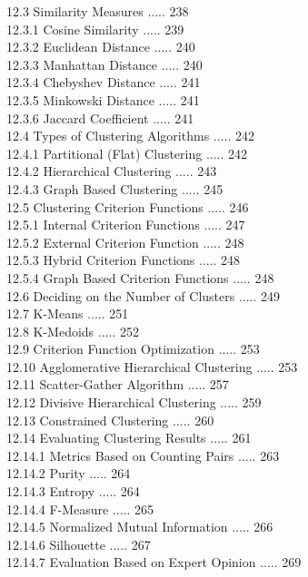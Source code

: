 \documentclass[10pt]{book}
\begin{document}
\begin{enumerate}
12.3 Similarity Measures ..... 238\\
12.3.1 Cosine Similarity ..... 239\\
12.3.2 Euclidean Distance ..... 240\\
12.3.3 Manhattan Distance ..... 240\\
12.3.4 Chebyshev Distance ..... 241\\
12.3.5 Minkowski Distance ..... 241\\
12.3.6 Jaccard Coefficient ..... 241\\
12.4 Types of Clustering Algorithms ..... 242\\
12.4.1 Partitional (Flat) Clustering ..... 242\\
12.4.2 Hierarchical Clustering ..... 243\\
12.4.3 Graph Based Clustering ..... 245\\
12.5 Clustering Criterion Functions ..... 246\\
12.5.1 Internal Criterion Functions ..... 247\\
12.5.2 External Criterion Function ..... 248\\
12.5.3 Hybrid Criterion Functions ..... 248\\
12.5.4 Graph Based Criterion Functions ..... 248\\
12.6 Deciding on the Number of Clusters ..... 249\\
12.7 K-Means ..... 251\\
12.8 K-Medoids ..... 252\\
12.9 Criterion Function Optimization ..... 253\\
12.10 Agglomerative Hierarchical Clustering ..... 253\\
12.11 Scatter-Gather Algorithm ..... 257\\
12.12 Divisive Hierarchical Clustering ..... 259\\
12.13 Constrained Clustering ..... 260\\
12.14 Evaluating Clustering Results ..... 261\\
12.14.1 Metrics Based on Counting Pairs ..... 263\\
12.14.2 Purity ..... 264\\
12.14.3 Entropy ..... 264\\
12.14.4 F-Measure ..... 265\\
12.14.5 Normalized Mutual Information ..... 266\\
12.14.6 Silhouette ..... 267\\
12.14.7 Evaluation Based on Expert Opinion ..... 269\\

\end{enumerate}
\end{document}
